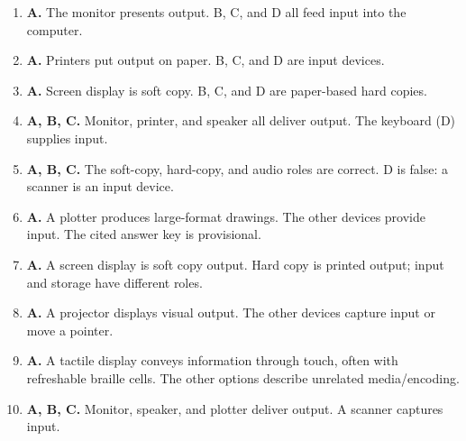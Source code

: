 \begin{enumerate}[label=\textbf{Q\arabic*.}, leftmargin=*]
\item \textbf{A.} The monitor presents output. B, C, and D all feed input into the computer.
\item \textbf{A.} Printers put output on paper. B, C, and D are input devices.
\item \textbf{A.} Screen display is soft copy. B, C, and D are paper-based hard copies.
\item \textbf{A, B, C.} Monitor, printer, and speaker all deliver output. The keyboard (D) supplies input.
\item \textbf{A, B, C.} The soft-copy, hard-copy, and audio roles are correct. D is false: a scanner is an input device.
\item \textbf{A.} A plotter produces large-format drawings. The other devices provide input. The cited answer key is provisional.

\item \textbf{A.} A screen display is soft copy output. Hard copy is printed output; input and storage have different roles.

\item \textbf{A.} A projector displays visual output. The other devices capture input or move a pointer.

\item \textbf{A.} A tactile display conveys information through touch, often with refreshable braille cells. The other options describe unrelated media/encoding.

\item \textbf{A, B, C.} Monitor, speaker, and plotter deliver output. A scanner captures input.

\end{enumerate}
